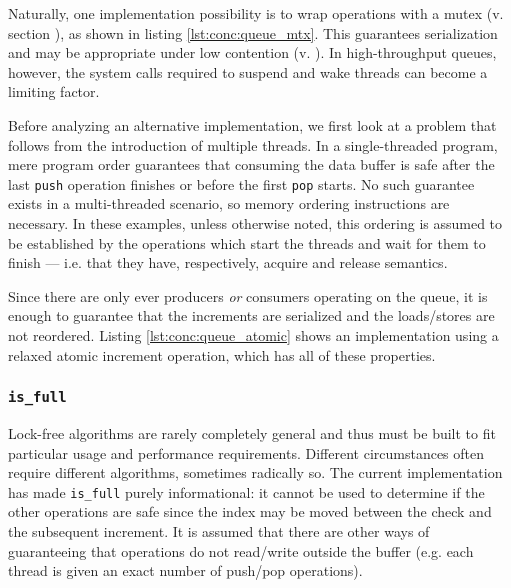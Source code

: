 
Naturally, one implementation possibility is to wrap operations with a mutex (v.
section ), as shown in listing
\ref{lst:conc:queue_mtx}.  This guarantees serialization and may be appropriate
under low contention (v. \cite{Preshing2011}).  In high-throughput queues,
however, the system calls required to suspend and wake threads can become a
limiting factor.

Before analyzing an alternative implementation, we first look at a problem that
follows from the introduction of multiple threads.  In a single-threaded
program, mere program order guarantees that consuming the data buffer is safe
after the last \texttt{push} operation finishes or before the first \texttt{pop}
starts.  No such guarantee exists in a multi-threaded scenario, so memory
ordering instructions are necessary.  In these examples, unless otherwise noted,
this ordering is assumed to be established by the operations which start the
threads and wait for them to finish --- i.e. that they have, respectively,
acquire and release semantics.

Since there are only ever producers \emph{or} consumers operating on the queue,
it is enough to guarantee that the increments are serialized and the
loads/stores are not reordered.  Listing \ref{lst:conc:queue_atomic} shows an
implementation using a relaxed atomic increment operation, which has all of
these properties.

\begin{figure}[ht]
    
\end{figure}

\subsubsection{\texttt{is\_full}}

Lock-free algorithms are rarely completely general and thus must be built to fit
particular usage and performance requirements.  Different circumstances often
require different algorithms, sometimes radically so.  The current
implementation has made \texttt{is\_full} purely informational: it cannot be
used to determine if the other operations are safe since the index may be moved
between the check and the subsequent increment.  It is assumed that there are
other ways of guaranteeing that operations do not read/write outside the buffer
(e.g. each thread is given an exact number of push/pop operations).

